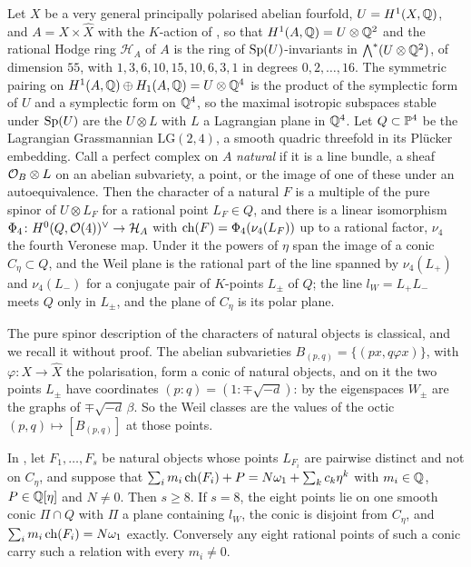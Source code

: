 \begin{setupenv}\label{setup:lagquadric}
Let $X$ be a very general principally polarised abelian fourfold,
$U=H^{1}(X,\mathbb{Q})$, and $A=X\times\widehat{X}$ with the $K$-action of
\cite[(29)]{paperI}, so that $H^{1}(A,\mathbb{Q})=U\otimes\mathbb{Q}^{2}$ and the rational Hodge
ring $\mathcal{H}_{A}$ of $A$ is the ring of $\operatorname{Sp}(U)$-invariants in
$\bigwedge^{*}(U\otimes\mathbb{Q}^{2})$, of dimension $55$, with
$1,3,6,10,15,10,6,3,1$ in degrees $0,2,\dots,16$. The symmetric pairing on
$H^{1}(A,\mathbb{Q})\oplus H_{1}(A,\mathbb{Q})=U\otimes\mathbb{Q}^{4}$ is the product of the
symplectic form of $U$ and a symplectic form on $\mathbb{Q}^{4}$, so the maximal
isotropic subspaces stable under $\operatorname{Sp}(U)$ are the $U\otimes L$ with $L$ a
Lagrangian plane in $\mathbb{Q}^{4}$. Let $Q\subset\mathbb{P}^{4}$ be the Lagrangian
Grassmannian $\mathrm{LG}(2,4)$, a smooth quadric threefold in its
Pl\"ucker embedding. Call a perfect complex on $A$ \emph{natural} if it is a line
bundle, a sheaf $\mathcal{O}_{B}\otimes L$ on an abelian subvariety, a point, or the
image of one of these under an autoequivalence. Then the character of a natural
$F$ is a multiple of the pure spinor of $U\otimes L_{F}$ for a rational point
$L_{F}\in Q$, and there is a linear isomorphism
$\Phi_{4}\colon H^{0}(Q,\mathcal{O}(4))^{\vee}\to\mathcal{H}_{A}$ with
$\operatorname{ch}(F)=\Phi_{4}(\nu_{4}(L_{F}))$ up to a rational factor, $\nu_{4}$ the
fourth Veronese map. Under it the powers of $\eta$ span the image of a conic
$C_{\eta}\subset Q$, and the Weil plane is the rational part of the line
spanned by $\nu_{4}(L_{+})$ and $\nu_{4}(L_{-})$ for a conjugate pair of
$K$-points $L_{\pm}$ of $Q$; the line $l_{W}=L_{+}L_{-}$ meets $Q$ only in
$L_{\pm}$, and the plane of $C_{\eta}$ is its polar plane.
\end{setupenv}

The pure spinor description of the characters of natural objects is
classical, and we recall it without proof. The abelian subvarieties
$B_{(p,q)}=\{(px,q\varphi x)\}$, with $\varphi\colon X\to\widehat{X}$ the
polarisation, form a conic of natural objects, and on it the two points $L_{\pm}$
have coordinates $(p:q)=(1:\mp\sqrt{-d})$: by \cite[Theorem~14.2(iv)]{paperI} the
eigenspaces $W_{\pm}$ are the graphs of $\mp\sqrt{-d}\,\beta$. So the Weil
classes are the values of the octic $(p,q)\mapsto[B_{(p,q)}]$ at those points.

\begin{theorem}[Minimal support at $n=4$]\label{thm:minimalsupport}
In , let $F_{1},\dots,F_{s}$ be natural objects whose
points $L_{F_{i}}$ are pairwise distinct and not on $C_{\eta}$, and suppose
that $\sum_{i}m_{i}\operatorname{ch}(F_{i})+P=N\omega_{1}+\sum_{k}c_{k}\eta^{k}$ with
$m_{i}\in\mathbb{Q}$, $P\in\mathbb{Q}[\eta]$ and $N\ne0$. Then $s\ge8$. If $s=8$, the eight
points lie on one smooth conic $\Pi\cap Q$ with $\Pi$ a plane containing
$l_{W}$, the conic is disjoint from $C_{\eta}$, and
$\sum_{i}m_{i}\operatorname{ch}(F_{i})=N\omega_{1}$ exactly. Conversely any eight rational
points of such a conic carry such a relation with every $m_{i}\ne0$.
\end{theorem}


